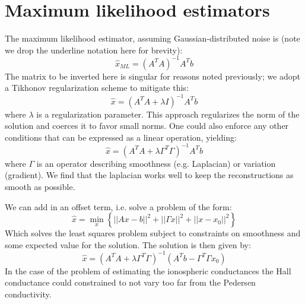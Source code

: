 \documentclass[11pt,letterpaper]{article}
\begin{document}
\section{Maximum likelihood estimators}

The maximum likelihood estimator, assuming Gaussian-distributed noise is (note we drop the underline notation here for brevity):
\begin{equation}
\hat{x}_{ML} = \left( A^T A  \right)^{-1} A^T b
\end{equation}
The matrix to be inverted here is singular for reasons noted previously; we adopt a Tikhonov regularization scheme to mitigate this:
\begin{equation}
\hat{x} = \left( A^T A  + \lambda I \right)^{-1} A^T b
\end{equation}
where $\lambda$ is a regularization parameter.  This approach regularizes the norm of the solution and coerces it to favor small norms.  One could also enforce any other conditions that can be expressed as a linear operation, yielding:
\begin{equation}
\hat{x} = \left( A^T A  + \lambda  \Gamma^T \Gamma \right)^{-1} A^T b
\end{equation}
where $\Gamma$ is an operator describing smoothness (e.g. Laplacian) or variation (gradient).  We find that the laplacian works well to keep the reconstructions as smooth as possible.  

We can add in an offset term, i.e. solve a problem of the form:
\begin{equation}
\hat{x} = \min_x \left\{  || Ax -b ||^2 + || \Gamma x||^2 +  || x - x_0 ||^2 \right\}
\end{equation}
Which solves the least squares problem subject to constraints on smoothness and some expected value for the solution.  The solution is then given by:
\begin{equation}
\hat{x} = \left( A^T A  + \lambda  \Gamma^T \Gamma \right)^{-1} \left( A^T b - \Gamma^T \Gamma x_0\right)
\end{equation}
In the case of the problem of estimating the ionospheric conductances the Hall conductance could constrained to not vary too far from the Pedersen conductivity.  
\end{document}
